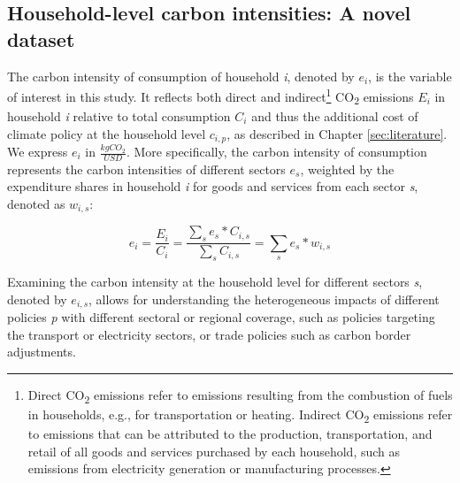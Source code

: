 \documentclass[12pt, a4paper]{article}
\begin{document}
\subsection{Household-level carbon intensities: A novel dataset} \label{sec:data}

The carbon intensity of consumption of household \textit{i}, denoted by $e_{i}$, is the variable of interest in this study. It reflects both direct and indirect\footnote{Direct CO\textsubscript{2} emissions refer to emissions resulting from the combustion of fuels in households, e.g., for transportation or heating. Indirect CO\textsubscript{2} emissions refer to emissions that can be attributed to the production, transportation, and retail of all goods and services purchased by each household, such as emissions from electricity generation or manufacturing processes.} CO\textsubscript{2} emissions $E_{i}$ in household \textit{i} relative to total consumption $C_{i}$ and thus the additional cost of climate policy at the household level $c_{i,p}$, as described in Chapter \ref{sec:literature}. We express $e_{i}$ in $\frac{kgCO_{2}}{USD}$. More specifically, the carbon intensity of consumption represents the carbon intensities of different sectors $e_{s}$, weighted by the expenditure shares in household \textit{i} for goods and services from each sector \textit{s}, denoted as $w_{i,s}$:


\begin{equation} \label{eq:ei}
e_{i} = \frac{E_{i}}{C_{i}} = \frac{\sum_{s} e_{s}*C_{i,s}}{\sum_{s} C_{i,s}} = \sum_{s} e_{s}*w_{i,s}
\end{equation}


Examining the carbon intensity at the household level for different sectors \textit{s}, denoted by $e_{i,s}$, allows for understanding the heterogeneous impacts of different policies \textit{p} with different sectoral or regional coverage, such as policies targeting the transport or electricity sectors, or trade policies such as carbon border adjustments.

\end{document}
